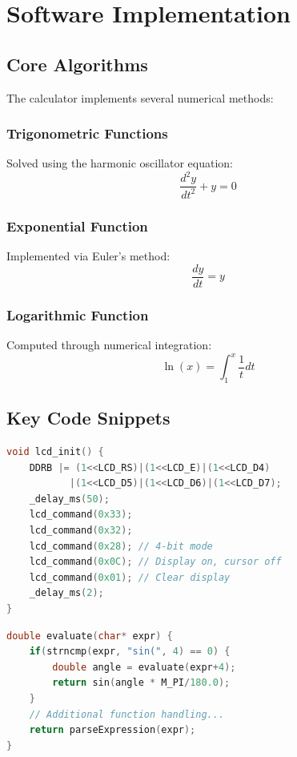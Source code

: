 \documentclass[12pt,a4paper]{article}
\numberwithin{equation}{section}
\numberwithin{figure}{section}
\numberwithin{table}{section}
\begin{document}
\section{Software Implementation}

\subsection{Core Algorithms}
The calculator implements several numerical methods:

\subsubsection{Trigonometric Functions}
Solved using the harmonic oscillator equation:
\begin{equation}
    \frac{d^2y}{dt^2} + y = 0
\end{equation}

\subsubsection{Exponential Function}
Implemented via Euler's method:
\begin{equation}
    \frac{dy}{dt} = y
\end{equation}

\subsubsection{Logarithmic Function}
Computed through numerical integration:
\begin{equation}
    \ln(x) = \int_1^x \frac{1}{t} dt
\end{equation}

\subsection{Key Code Snippets}

\begin{lstlisting}[language=C,caption=LCD Initialization]
void lcd_init() {
    DDRB |= (1<<LCD_RS)|(1<<LCD_E)|(1<<LCD_D4)
           |(1<<LCD_D5)|(1<<LCD_D6)|(1<<LCD_D7);
    _delay_ms(50);
    lcd_command(0x33);
    lcd_command(0x32);
    lcd_command(0x28); // 4-bit mode
    lcd_command(0x0C); // Display on, cursor off
    lcd_command(0x01); // Clear display
    _delay_ms(2);
}
\end{lstlisting}

\begin{lstlisting}[language=C,caption=Expression Evaluation]
double evaluate(char* expr) {
    if(strncmp(expr, "sin(", 4) == 0) {
        double angle = evaluate(expr+4);
        return sin(angle * M_PI/180.0);
    }
    // Additional function handling...
    return parseExpression(expr);
}
\end{lstlisting}
\end{document}
